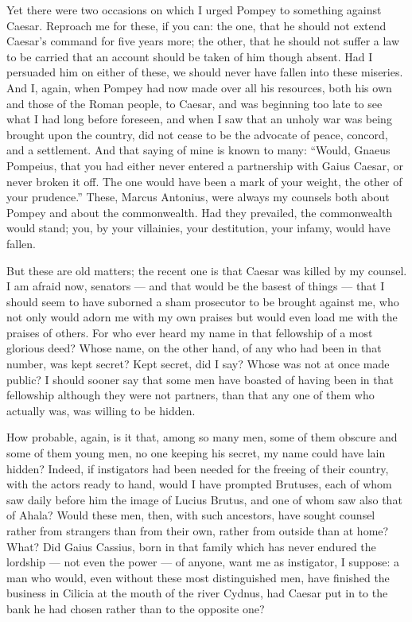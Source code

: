  Yet there were two occasions on which I urged Pompey to something against Caesar. Reproach me for these, if you can: the one, that he should not extend Caesar's command for five years more; the other, that he should not suffer a law to be carried that an account should be taken of him though absent. Had I persuaded him on either of these, we should never have fallen into these miseries. And I, again, when Pompey had now made over all his resources, both his own and those of the Roman people, to Caesar, and was beginning too late to see what I had long before foreseen, and when I saw that an unholy war was being brought upon the country, did not cease to be the advocate of peace, concord, and a settlement. And that saying of mine is known to many: ``Would, Gnaeus Pompeius, that you had either never entered a partnership with Gaius Caesar, or never broken it off. The one would have been a mark of your weight, the other of your prudence.'' These, Marcus Antonius, were always my counsels both about Pompey and about the commonwealth. Had they prevailed, the commonwealth would stand; you, by your villainies, your destitution, your infamy, would have fallen.

 But these are old matters; the recent one is that Caesar was killed by my counsel. I am afraid now, senators --- and that would be the basest of things --- that I should seem to have suborned a sham prosecutor to be brought against me, who not only would adorn me with my own praises but would even load me with the praises of others. For who ever heard my name in that fellowship of a most glorious deed? Whose name, on the other hand, of any who had been in that number, was kept secret? Kept secret, did I say? Whose was not at once made public? I should sooner say that some men have boasted of having been in that fellowship although they were not partners, than that any one of them who actually was, was willing to be hidden.

 How probable, again, is it that, among so many men, some of them obscure and some of them young men, no one keeping his secret, my name could have lain hidden? Indeed, if instigators had been needed for the freeing of their country, with the actors ready to hand, would I have prompted Brutuses, each of whom saw daily before him the image of Lucius Brutus, and one of whom saw also that of Ahala? Would these men, then, with such ancestors, have sought counsel rather from strangers than from their own, rather from outside than at home? What? Did Gaius Cassius, born in that family which has never endured the lordship --- not even the power --- of anyone, want me as instigator, I suppose: a man who would, even without these most distinguished men, have finished the business in Cilicia at the mouth of the river Cydnus, had Caesar put in to the bank he had chosen rather than to the opposite one?

